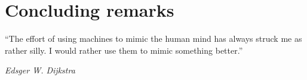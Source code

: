 \chapter*{Concluding remarks}
\label{chap:concl}

\epigraph{``The effort of using machines to mimic the human mind has always struck me as rather silly. I would rather use them to mimic something better.''}{\textit{Edsger W. Dijkstra}}
